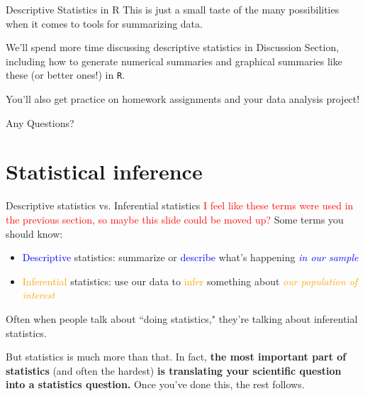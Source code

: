 \documentclass[10pt,t]{beamer}
\begin{document}
\begin{frame}{Descriptive Statistics in R}
This is just a small taste of the many possibilities when it comes to tools for summarizing data.

\vspace{0.3cm}

We’ll spend more time discussing descriptive statistics in Discussion Section, including how to generate numerical summaries and graphical summaries like these (or better ones!) in \texttt{R}.

\vspace{0.3cm}

You’ll also get practice on homework assignments and your data analysis project!

\end{frame}

\begin{frame}[c]
\centering \huge Any Questions?
\end{frame}

\section{Statistical inference}

\begin{frame}{Descriptive statistics vs. Inferential statistics}
	\textcolor{red}{I feel like these terms were used in the previous section, so maybe this slide could be moved up?}
Some terms you should know:

\vspace{0.3cm}

\begin{itemize}
	\item \textcolor{blue}{Descriptive} statistics: summarize or \textcolor{blue}{describe} what's happening \textcolor{blue}{\textit{in our sample}}
	\item \textcolor{orange}{Inferential} statistics: use our data to \textcolor{orange}{infer} something about \textcolor{orange}{\textit{our population of interest}}
\end{itemize}

\vspace{0.3cm}

Often when people talk about ``doing statistics," they're talking about inferential statistics.

\vspace{0.3cm}

But statistics is much more than that. In fact, \textbf{the most important part of statistics} (and often the hardest) \textbf{is translating your scientific question into a statistics question.} Once you've done this, the rest follows.

\end{frame}
\end{document}
